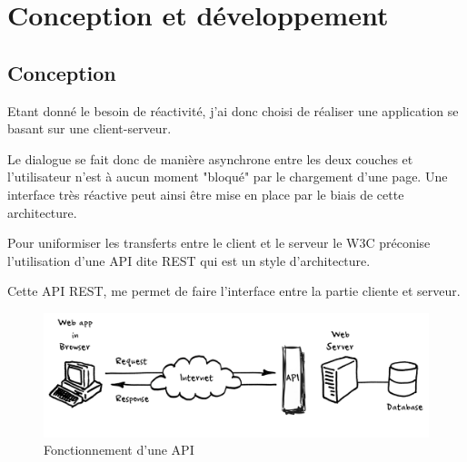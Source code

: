 \documentclass{report}
\begin{document}
\section{Conception et développement}
\subsection{Conception}
Etant donné le besoin de réactivité, j'ai donc choisi de réaliser une application se basant sur une \gls{client-serveur}. 

Le dialogue se fait donc de manière \gls{asynchrone} entre les deux couches et l'utilisateur n'est à aucun moment "bloqué" par le chargement d'une page. Une interface très réactive peut ainsi être mise en place par le biais de cette architecture. 

Pour uniformiser les transferts entre le client et le serveur le \gls{W3C} préconise l'utilisation d'une \gls{API} dite \gls{REST} qui est un style d'architecture. 

Cette \gls{API} \gls{REST}, me permet de faire l'interface entre la partie cliente et serveur. 

\begin{figure}[h!]
	\centering
	\includegraphics[width=1\textwidth]{assets/rest.png}
	\caption{Fonctionnement d'une API}
\end{figure}
\end{document}

